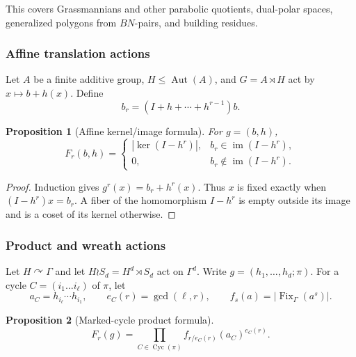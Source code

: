 \documentclass[10pt]{article}
\newcommand{\Fix}{\operatorname{Fix}}
\newcommand{\Aut}{\operatorname{Aut}}
\newtheorem{proposition}{Proposition}
\begin{document}
This covers Grassmannians and other parabolic quotients, dual-polar spaces,
generalized polygons from $BN$-pairs, and building residues.

\subsubsection{Affine translation actions}

Let $A$ be a finite additive group, $H\leq\Aut(A)$, and
$G=A\rtimes H$ act by $x\mapsto b+h(x)$.  Define
\[
 b_r=(I+h+\cdots+h^{r-1})b.
\]

\begin{proposition}[Affine kernel/image formula]\label{nd:association_schemes:prop:affine}
For $g=(b,h)$,
\begin{equation}\label{nd:association_schemes:eq:affine}
 \boxed{F_r(b,h)=
 \begin{cases}
 |\ker(I-h^r)|,&b_r\in\operatorname{im}(I-h^r),\\
 0,&b_r\notin\operatorname{im}(I-h^r).
 \end{cases}}
\end{equation}
\end{proposition}

\begin{proof}
Induction gives $g^r(x)=b_r+h^r(x)$.  Thus $x$ is fixed exactly when
$(I-h^r)x=b_r$.  A fiber of the homomorphism $I-h^r$ is empty outside its
image and is a coset of its kernel otherwise.
\end{proof}

\subsubsection{Product and wreath actions}

Let $H\curvearrowright\Gamma$ and let $H\wr S_d=H^d\rtimes S_d$ act on
$\Gamma^d$.  Write $g=(h_1,\ldots,h_d;\pi)$.  For a cycle
$C=(i_1\ldots i_\ell)$ of $\pi$, let
\[
 a_C=h_{i_\ell}\cdots h_{i_1},\qquad e_C(r)=\gcd(\ell,r),
 \qquad f_s(a)=|\Fix_\Gamma(a^s)|.
\]

\begin{proposition}[Marked-cycle product formula]\label{nd:association_schemes:prop:wreath}
\begin{equation}\label{nd:association_schemes:eq:wreath}
 \boxed{F_r(g)=\prod_{C\in\operatorname{Cyc}(\pi)}
 f_{r/e_C(r)}(a_C)^{e_C(r)}.}
\end{equation}
\end{proposition}
\end{document}
